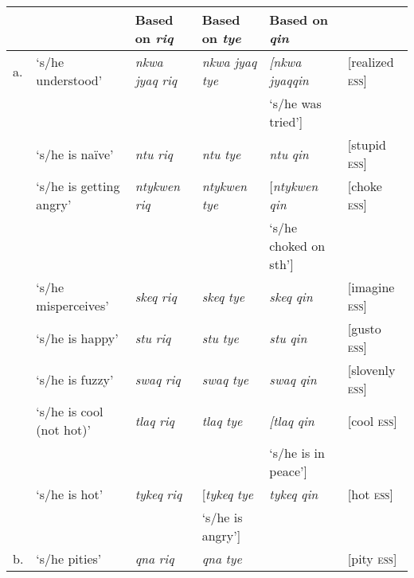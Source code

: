 \documentclass[output=paper]{langsci/langscibook}
\begin{document}
\begin{table}[t]
\footnotesize
\begin{tabularx}{\textwidth}{l@{~} Q l@{}l@{}l l@{}}
\lsptoprule
&&Based on \emph{riq}&Based on \emph{tye}&Based on \emph{qin}& \\
\midrule
a.&`s/he understood'&\emph{nkwa} \emph{jyaq} \emph{riq} &\emph{nkwa} \emph{jyaq} \emph{tye }&\emph{[nkwa} \emph{jyaq}\emph{qin} &[realized \textsc{ess}] \\
&&&&`s/he was tried']& \\
&`s/he is na{\"i}ve'&\emph{ntu} \emph{riq}&\emph{ntu} \emph{tye}&\emph{ntu} \emph{qin}&[stupid \textsc{ess}] \\
&`s/he is getting angry'&\emph{ntykwen} \emph{riq}&\emph{ntykwen} \emph{tye}&[\emph{ntykwen} \emph{qin}&[choke \textsc{ess}] \\
&&&&`s/he choked on sth']& \\
&`s/he misperceives' &\emph{skeq} \emph{riq} &\emph{skeq} \emph{tye} &\emph{skeq} \emph{qin}&[imagine \textsc{ess}] \\
&`s/he is happy'&\emph{stu} \emph{riq} &\emph{stu} \emph{tye} &\emph{stu} \emph{qin}&[gusto \textsc{ess}] \\
&`s/he is fuzzy'&\emph{swaq} \emph{riq }&\emph{swaq} \emph{tye}&\emph{swaq} \emph{qin}&[slovenly \textsc{ess}] \\
&`s/he is cool (not hot)'&\emph{tlaq} \emph{riq}&\emph{tlaq} \emph{tye}&\emph{[tlaq} \emph{qin}&[cool \textsc{ess}] \\
&&&& `s/he is in peace']& \\
&`s/he is hot'&\emph{tykeq} \emph{riq}&[\emph{tykeq} \emph{tye}&\emph{tykeq} \emph{qin}&[hot \textsc{ess}] \\
&&&`s/he is angry']&& \\
b.&`s/he pities' &\emph{qna} \emph{riq} &\emph{qna} \emph{tye} &&[pity \textsc{ess}] \\

\end{tabularx}
\end{table}
\end{document}

